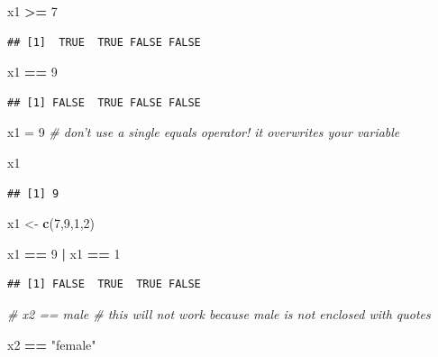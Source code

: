 \documentclass[]{book}
\newenvironment{Shaded}{\begin{snugshade}}{\end{snugshade}}
\newcommand{\CommentTok}[1]{\textcolor[rgb]{0.56,0.35,0.01}{\textit{#1}}}
\newcommand{\DecValTok}[1]{\textcolor[rgb]{0.00,0.00,0.81}{#1}}
\newcommand{\KeywordTok}[1]{\textcolor[rgb]{0.13,0.29,0.53}{\textbf{#1}}}
\newcommand{\NormalTok}[1]{#1}
\newcommand{\OperatorTok}[1]{\textcolor[rgb]{0.81,0.36,0.00}{\textbf{#1}}}
\newcommand{\StringTok}[1]{\textcolor[rgb]{0.31,0.60,0.02}{#1}}
\theoremstyle{definition}
\theoremstyle{definition}
\theoremstyle{definition}
\theoremstyle{remark}
\begin{document}
\begin{Shaded}
\begin{Highlighting}[]
\NormalTok{x1 }\OperatorTok{>=}\StringTok{ }\DecValTok{7}
\end{Highlighting}
\end{Shaded}

\begin{verbatim}
## [1]  TRUE  TRUE FALSE FALSE
\end{verbatim}

\begin{Shaded}
\begin{Highlighting}[]
\NormalTok{x1 }\OperatorTok{==}\StringTok{ }\DecValTok{9}
\end{Highlighting}
\end{Shaded}

\begin{verbatim}
## [1] FALSE  TRUE FALSE FALSE
\end{verbatim}

\begin{Shaded}
\begin{Highlighting}[]
\NormalTok{x1 =}\StringTok{ }\DecValTok{9}  \CommentTok{# don't use a single equals operator!  it overwrites your variable}

\NormalTok{x1}
\end{Highlighting}
\end{Shaded}

\begin{verbatim}
## [1] 9
\end{verbatim}

\begin{Shaded}
\begin{Highlighting}[]
\NormalTok{x1 <-}\StringTok{ }\KeywordTok{c}\NormalTok{(}\DecValTok{7}\NormalTok{,}\DecValTok{9}\NormalTok{,}\DecValTok{1}\NormalTok{,}\DecValTok{2}\NormalTok{)}

\NormalTok{x1 }\OperatorTok{==}\StringTok{ }\DecValTok{9} \OperatorTok{|}\StringTok{ }\NormalTok{x1 }\OperatorTok{==}\StringTok{ }\DecValTok{1}
\end{Highlighting}
\end{Shaded}

\begin{verbatim}
## [1] FALSE  TRUE  TRUE FALSE
\end{verbatim}

\begin{Shaded}
\begin{Highlighting}[]
\CommentTok{# x2 == male  # this will not work because male is not enclosed with quotes}

\NormalTok{x2 }\OperatorTok{==}\StringTok{ "female"}
\end{Highlighting}
\end{Shaded}
\end{document}
